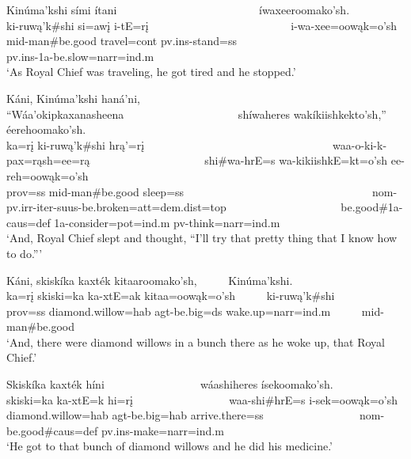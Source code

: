 \begin{exe}
\item\label{EJ63} \glll Kinúma'kshi sími ítani ~ ~ ~ ~ ~ ~ ~ ~ ~ ~ ~ ~ ~ ~ ~  íwaxeeroomako'sh.\\
ki-ruwą'k\#shi si=awį i-tE=rį ~ ~ ~ ~ ~ ~ ~ ~ ~ ~ ~ ~ ~ ~ ~ i-wa-xee=oowąk=o'sh\\
mid-\textnormal{man}\#\textnormal{be.good} \textnormal{travel}=cont pv.ins-\textnormal{stand}=ss ~ ~ ~ ~ ~ ~ ~ ~ ~ ~ ~ ~ ~ ~ ~ pv.ins-1a-\textnormal{be.slow}=narr=ind.m\\
\glt `As Royal Chief was traveling, he got tired and he stopped.'

\item\label{EJ64} \glll Káni, Kinúma'kshi haná'ni, ~ ~ ~ ~ ~ ~ ~ ~ ~ ~ ~ ~ ~ ~ ~ ~ ~ ~ ~ ~ ``Wáa'okipkaxanasheena ~ ~ ~ ~ ~ ~ ~ ~ ~ ~ ~ ~ shíwaheres wakíkiishkekto'sh,'' éerehoomako'sh.\\
ka=rį ki-ruwą'k\#shi hrą'=rį ~ ~ ~ ~ ~ ~ ~ ~ ~ ~ ~ ~ ~ ~ ~ ~ ~ ~ ~ ~ waa-o-ki-k-pax=rąsh=ee=rą ~ ~ ~ ~ ~ ~ ~ ~ ~ ~ ~ ~ shi\#wa-hrE=s wa-kikiishkE=kt=o'sh ee-reh=oowąk=o'sh\\
prov=ss mid-\textnormal{man}\#\textnormal{be.good} \textnormal{sleep}=ss ~ ~ ~ ~ ~ ~ ~ ~ ~ ~ ~ ~ ~ ~ ~ ~ ~ ~ ~ ~ nom-pv.irr-iter-suus-\textnormal{be.broken}=att=dem.dist=top ~ ~ ~ ~ ~ ~ ~ ~ ~ ~ ~ ~ \textnormal{be.good}\#1a-caus=def 1a-\textnormal{consider}=pot=ind.m pv-\textnormal{think}=narr=ind.m\\
\glt `And, Royal Chief slept and thought, ``I'll try that pretty thing that I know how to do.{''}'

\item\label{EJ65} \glll Káni, skiskíka kaxték kitaaroomako'sh, ~ ~ ~  Kinúma'kshi.\\
ka=rį skiski=ka ka-xtE=ak kitaa=oowąk=o'sh ~ ~ ~ ki-ruwą'k\#shi\\
prov=ss \textnormal{diamond.willow}=hab agt-\textnormal{be.big}=ds \textnormal{wake.up}=narr=ind.m ~ ~ ~ mid-\textnormal{man}\#\textnormal{be.good}\\
\glt `And, there were diamond willows in a bunch there as he woke up, that Royal Chief.'

\item\label{EJ66} \glll Skiskíka kaxték híni ~ ~ ~ ~ ~ ~ ~ ~ ~ ~ wáashiheres ísekoomako'sh.\\
skiski=ka ka-xtE=k hi=rį ~ ~ ~ ~ ~ ~ ~ ~ ~ ~ waa-shi\#hrE=s i-sek=oowąk=o'sh\\
\textnormal{diamond.willow}=hab agt-\textnormal{be.big}=hab \textnormal{arrive.there}=ss ~ ~ ~ ~ ~ ~ ~ ~ ~ ~ nom-\textnormal{be.good}\#caus=def pv.ins-\textnormal{make}=narr=ind.m\\
\glt `He got to that bunch of diamond willows and he did his medicine.'


\end{exe}
